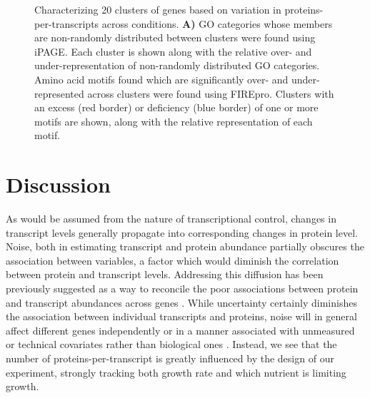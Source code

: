 \begin{figure}[h!]
\begin{center}
\hspace{1mm}
\caption[Characterizing 20 clusters of genes based on variation in proteins-per-transcripts across conditions]{Characterizing 20 clusters of genes based on variation in proteins-per-transcripts across conditions. \textbf{A)} GO categories whose members are non-randomly distributed between clusters were found using iPAGE. Each cluster is shown along with the relative over- and under-representation of non-randomly distributed GO categories. Amino acid motifs found which are significantly over- and under-represented across clusters were found using FIREpro. Clusters with an excess (red border) or deficiency (blue border) of one or more motifs are shown, along with the relative representation of each motif. }
\label{ch-pta:fire_page}
\end{center}
\end{figure}


\section{Discussion}

As would be assumed from the nature of transcriptional control, changes in transcript levels generally propagate into corresponding changes in protein level.  Noise, both in estimating transcript and protein abundance partially obscures the association between variables, a factor which would diminish the correlation between protein and transcript levels. Addressing this diffusion has been previously suggested as a way to reconcile the poor associations between protein and transcript abundances across genes \cite{Csardi:2015kx}.  While uncertainty certainly diminishes the association between individual transcripts and proteins, noise will in general affect different genes independently or in a manner associated with unmeasured or technical covariates rather than biological ones \cite{Leek:2007kn}. Instead, we see that the number of proteins-per-transcript is greatly influenced by the design of our experiment, strongly tracking both growth rate and which nutrient is limiting growth.

